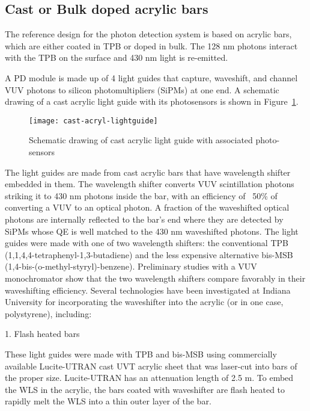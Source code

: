 \subsection{Cast or Bulk doped acrylic bars}

The reference design for the photon detection system is based on
acrylic bars, which are either coated in TPB or doped in bulk. The 128
nm photons interact with the TPB on the surface and 430 nm light is
re-emitted.

A PD module is made up of 4 light guides that capture, waveshift, and
channel VUV photons to silicon photomultipliers (SiPMs) at one end.  A
schematic drawing of a cast acrylic light guide with its photosensors
is shown in Figure~\ref{fig:cast-acryl-lightguide}.

\begin{figure}[htbp]
\centering
\texttt{[image: cast-acryl-lightguide]}
\caption[Schematic drawing of cast acrylic light guide]{Schematic drawing of cast acrylic light guide with associated photo-sensors}
\label{fig:cast-acryl-lightguide}
\end{figure}


The light guides are made from cast acrylic bars that have wavelength
shifter embedded in them.  The wavelength shifter converts VUV
scintillation photons striking it to 430 nm photons inside the bar,
with an efficiency of ~50\% of converting a VUV to an optical photon.
A fraction of the waveshifted optical photons are internally reflected
to the bar's end where they are detected by SiPMs whose QE is well
matched to the 430 nm waveshifted photons. The light guides were made
with one of two wavelength shifters: the conventional TPB
(1,1,4,4-tetraphenyl-1,3-butadiene) and the less expensive alternative
bis-MSB (1,4-bis-(o-methyl-styryl)-benzene). Preliminary studies with
a VUV monochromator show that the two wavelength shifters compare
favorably in their waveshifting efficiency.  Several technologies have
been investigated at Indiana University for incorporating the
waveshifter into the acrylic (or in one case, polystyrene), including:

1.  Flash heated bars

These light guides were made with TPB and bis-MSB using commercially
available Lucite-UTRAN cast UVT acrylic sheet that was laser-cut into
bars of the proper size. Lucite-UTRAN has an attenuation length of 2.5
m.  To embed the WLS in the acrylic, the bars coated with waveshifter
are flash heated to rapidly melt the WLS into a thin outer layer of
the bar.

